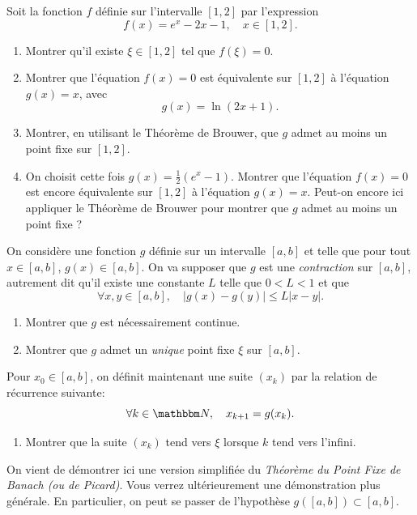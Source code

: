 \begin{exercice}
\label{exo:fonctionsfg}

Soit la fonction $f$ définie sur l'intervalle $[1,2]$ par l'expression
\[
f(x) = e^x - 2 x - 1, \quad x\in[1,2].
\]

\begin{enumerate}
\item Montrer qu'il existe $\xi \in [1,2]$ tel que $f(\xi)=0$.

\item Montrer que l'équation $f(x)=0$ est équivalente sur $[1,2]$ à l'équation $g(x) = x$, avec 
\[
g(x) = \ln ( 2x + 1).
\]

\item Montrer, en utilisant le Théorème de Brouwer, que $g$ admet au moins un point fixe sur $[1,2]$.

\item On choisit cette fois $g(x)=\frac12 ( e^x - 1)$. Montrer que l'équation $f(x)=0$ est encore équivalente sur $[1,2]$ à l'équation $g(x)=x$. Peut-on encore ici appliquer le Théorème de Brouwer pour montrer que $g$ admet au moins un point fixe ?

\end{enumerate}

\end{exercice}

\medskip

\begin{exercice}
\label{exo:pointFixeBanach}

On considère une fonction $g$ définie sur un intervalle $[a,b]$ et telle que pour tout $x \in [a,b]$, $g(x) \in [a,b]$.
On va supposer que $g$ est une \emph{contraction} sur $[a,b]$, autrement dit qu'il existe une constante $L$ telle que $0 < L < 1$ et que
\[
\forall x,y \in [a,b], \quad
| g(x) - g(y) | \leq L | x - y |.
\]

\begin{enumerate}
\item Montrer que $g$ est nécessairement continue.

\item Montrer que $g$ admet un \emph{unique} point fixe $\xi$ sur $[a,b]$.
\end{enumerate}

Pour $x_0 \in [a,b]$, on définit maintenant une suite $(x_k)$ par la relation de récurrence suivante:
\[
\forall k \in \eN, \quad x_{k+1} = g(x_k).
\]

\begin{enumerate}
\item[3] Montrer que la suite $(x_{k})$ tend vers $\xi$ lorsque $k$ tend vers l'infini.
\end{enumerate}

On vient de démontrer ici une version simplifiée du \emph{Théorème du Point Fixe de Banach (ou de Picard)}.
Vous verrez ultérieurement une démonstration plus générale. En particulier, on peut se passer de l'hypothèse $g([a,b]) \subset [a,b]$.

\end{exercice}

